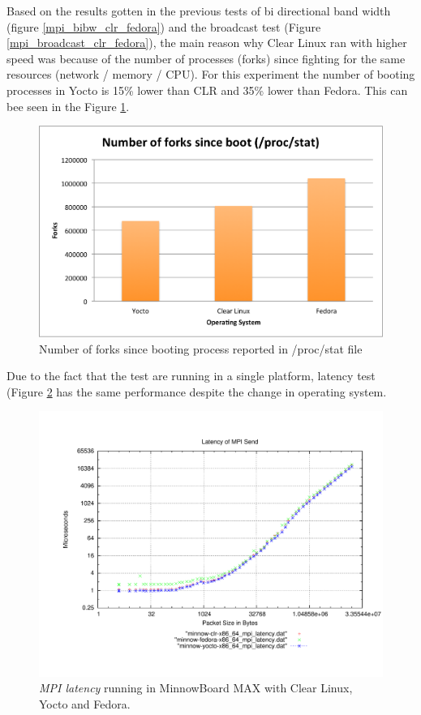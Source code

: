 Based on the results gotten in the previous tests of bi directional band
width (figure \ref{mpi_bibw_clr_fedora}) and the broadcast test (Figure
\ref{mpi_broadcast_clr_fedora}), the main reason why Clear Linux ran with
higher speed was because of the number of processes (forks) since fighting for
the same resources (network / memory / CPU). For this experiment the number of
booting processes in Yocto is 15\% lower than CLR and 35\%
lower than Fedora. This can bee seen in the Figure \ref{number_forks_yocto}.

\begin{figure}[H]
\centering
\includegraphics[width=1 \textwidth]{images/number_forks_yocto.png}
\caption{Number of forks since booting process reported in /proc/stat file }
\label{number_forks_yocto}
\end{figure}

Due to the fact that the test are running in a single platform, latency test (Figure
\ref{mpi_latency_yocto} has the same performance despite the change in
operating system.

\begin{figure}
  \includegraphics[width=\paperwidth]{images/mpbench_yocto_experiments/mpi_latency.pdf}
\caption{\textit{MPI latency} running in  MinnowBoard MAX  with Clear Linux,
Yocto and Fedora.}
\label{mpi_latency_yocto}
\end{figure}

